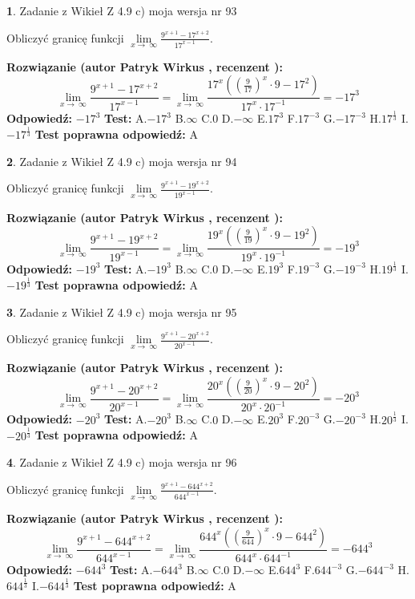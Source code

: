 \documentclass[12pt, a4paper]{article}
\theoremstyle{definition} %
\newtheorem{zad}{}
\newcommand{\zadStart}[1]{\begin{zad}#1\newline}
\newcommand{\zadStop}{\end{zad}}
\newcommand{\rozwStart}[2]{\noindent \textbf{Rozwiązanie (autor #1 , recenzent #2): }\newline}
\newcommand{\rozwStop}{\newline}
\newcommand{\odpStart}{\noindent \textbf{Odpowiedź:}\newline}
\newcommand{\odpStop}{\newline}
\newcommand{\testStart}{\noindent \textbf{Test:}\newline}
\newcommand{\testStop}{\newline}
\newcommand{\kluczStart}{\noindent \textbf{Test poprawna odpowiedź:}\newline}
\newcommand{\kluczStop}{\newline}
\begin{document}
\zadStart{Zadanie z Wikieł Z 4.9 c) moja wersja nr 93}


Obliczyć granicę funkcji  $\lim\limits_{x\to\ \infty}\frac{9^{x+1}-17^{x+2}}{17^{x-1}}$.
\zadStop
\rozwStart{Patryk Wirkus}{}
$$\lim\limits_{x\to\ \infty}\frac{9^{x+1}-17^{x+2}}{17^{x-1}}=\lim\limits_{x\to\ \infty}\frac{17^{x}((\frac{9}{17})^{x}\cdot 9 -17^{2})}{17^{x}\cdot 17^{-1}} = -17^{3}$$
\rozwStop
\odpStart
$-17^{3}$
\odpStop
\testStart
A.$-17^{3}$ B.$\infty$ C.$0$ D.$-\infty$ E.$17^{3}$
F.$17^{-3}$ G.$-17^{-3}$
H.$17^{\frac{1}{3}}$
I.$-17^{\frac{1}{3}}$
\testStop
\kluczStart
A
\kluczStop



\zadStart{Zadanie z Wikieł Z 4.9 c) moja wersja nr 94}


Obliczyć granicę funkcji  $\lim\limits_{x\to\ \infty}\frac{9^{x+1}-19^{x+2}}{19^{x-1}}$.
\zadStop
\rozwStart{Patryk Wirkus}{}
$$\lim\limits_{x\to\ \infty}\frac{9^{x+1}-19^{x+2}}{19^{x-1}}=\lim\limits_{x\to\ \infty}\frac{19^{x}((\frac{9}{19})^{x}\cdot 9 -19^{2})}{19^{x}\cdot 19^{-1}} = -19^{3}$$
\rozwStop
\odpStart
$-19^{3}$
\odpStop
\testStart
A.$-19^{3}$ B.$\infty$ C.$0$ D.$-\infty$ E.$19^{3}$
F.$19^{-3}$ G.$-19^{-3}$
H.$19^{\frac{1}{3}}$
I.$-19^{\frac{1}{3}}$
\testStop
\kluczStart
A
\kluczStop



\zadStart{Zadanie z Wikieł Z 4.9 c) moja wersja nr 95}


Obliczyć granicę funkcji  $\lim\limits_{x\to\ \infty}\frac{9^{x+1}-20^{x+2}}{20^{x-1}}$.
\zadStop
\rozwStart{Patryk Wirkus}{}
$$\lim\limits_{x\to\ \infty}\frac{9^{x+1}-20^{x+2}}{20^{x-1}}=\lim\limits_{x\to\ \infty}\frac{20^{x}((\frac{9}{20})^{x}\cdot 9 -20^{2})}{20^{x}\cdot 20^{-1}} = -20^{3}$$
\rozwStop
\odpStart
$-20^{3}$
\odpStop
\testStart
A.$-20^{3}$ B.$\infty$ C.$0$ D.$-\infty$ E.$20^{3}$
F.$20^{-3}$ G.$-20^{-3}$
H.$20^{\frac{1}{3}}$
I.$-20^{\frac{1}{3}}$
\testStop
\kluczStart
A
\kluczStop



\zadStart{Zadanie z Wikieł Z 4.9 c) moja wersja nr 96}


Obliczyć granicę funkcji  $\lim\limits_{x\to\ \infty}\frac{9^{x+1}-644^{x+2}}{644^{x-1}}$.
\zadStop
\rozwStart{Patryk Wirkus}{}
$$\lim\limits_{x\to\ \infty}\frac{9^{x+1}-644^{x+2}}{644^{x-1}}=\lim\limits_{x\to\ \infty}\frac{644^{x}((\frac{9}{644})^{x}\cdot 9 -644^{2})}{644^{x}\cdot 644^{-1}} = -644^{3}$$
\rozwStop
\odpStart
$-644^{3}$
\odpStop
\testStart
A.$-644^{3}$ B.$\infty$ C.$0$ D.$-\infty$ E.$644^{3}$
F.$644^{-3}$ G.$-644^{-3}$
H.$644^{\frac{1}{3}}$
I.$-644^{\frac{1}{3}}$
\testStop
\kluczStart
A
\kluczStop
\end{document}
